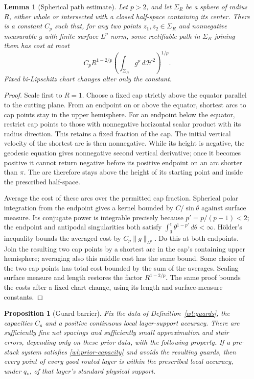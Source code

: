 \documentclass[11pt]{article}
\numberwithin{equation}{section}
\newtheorem{lemma}[theorem]{Lemma}
\newtheorem{proposition}[theorem]{Proposition}
\theoremstyle{definition}
\theoremstyle{remark}
\begin{document}
\begin{lemma}[Spherical path estimate]\label{wl:sphere}
Let $p>2$, and let $\Sigma_R$ be a sphere of radius $R$, either whole
or intersected with a closed half-space containing its center.  There
is a constant $C_p$ such that, for any two points $z_1,z_2\in\Sigma_R$
and nonnegative measurable $g$ with finite surface $L^p$ norm, some
rectifiable path in $\Sigma_R$ joining them has cost at most
\begin{equation}\label{wl:sphere-upper}
 C_p R^{1-2/p}\left(\int_{\Sigma_R}g^p\,d\mathcal H^2\right)^{1/p}.
\end{equation}
Fixed bi-Lipschitz chart changes alter only the constant.
\end{lemma}

\begin{proof}
Scale first to $R=1$.  Choose a fixed cap strictly above the equator
parallel to the cutting plane.  From an endpoint on or above the
equator, shortest arcs to cap points stay in the upper hemisphere.
For an endpoint below the equator, restrict cap points to those with
nonnegative horizontal scalar product with its radius direction.
This retains a fixed fraction of the cap.  The initial vertical
velocity of the shortest arc is then nonnegative.  While its height
is negative, the geodesic equation gives nonnegative second
vertical derivative; once it becomes positive it cannot return
negative before its positive endpoint on an arc shorter than $\pi$.
The arc therefore stays above the height of its starting point and
inside the prescribed half-space.

Average the cost of these arcs over the permitted cap fraction.
Spherical polar integration from the endpoint gives a kernel bounded
by $C/\sin\theta$ against surface measure.  Its conjugate power is
integrable precisely because $p'=p/(p-1)<2$; the endpoint and
antipodal singularities both satisfy
$\int_0^\epsilon\theta^{1-p'}\,d\theta<\infty$.
Hölder's inequality bounds the averaged cost by $C_p\|g\|_{L^p}$.
Do this at both endpoints.  Join the resulting two cap points by a
shortest arc in the cap's containing upper hemisphere; averaging
also this middle cost has the same bound.  Some choice of the two
cap points has total cost bounded by the sum of the averages.
Scaling surface measure and length restores the factor
$R^{1-2/p}$.  The same proof bounds the costs after a fixed chart
change, using its length and surface-measure constants.
\end{proof}

\begin{proposition}[Guard barrier]\label{wl:barrier}
Fix the data of Definition~\ref{wl:guards}, the capacities $C_a$ and
a positive continuous local layer-support accuracy.  There are
sufficiently fine net spacings and sufficiently small approximation
and stair errors, depending only on these prior data, with the
following property.  If a pre-stack system satisfies
\eqref{wl:prior-capacity} and avoids the resulting guards, then every
point of every good routed layer is within the prescribed local
accuracy, under $q_*$, of that layer's standard physical support.
\end{proposition}
\end{document}
